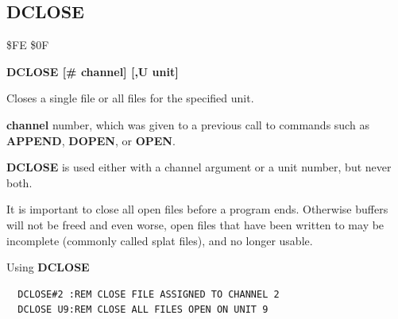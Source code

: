 \subsection{DCLOSE}
\begin{description}[leftmargin=2cm,style=nextline]
\item [Token:] \$FE \$0F
\item [Format:] {\bf DCLOSE [\# channel] [,U unit] }
\item [Usage:]
   Closes a single file or
   all files for the specified unit.

    {\bf channel} number, which was given to a previous
    call to commands such as {\bf APPEND}, {\bf DOPEN}, or {\bf OPEN}.

   \unitdefinition

   {\bf DCLOSE} is used either with a channel argument
   or a unit number, but never both.

\item [Remarks:]
   It is important to close all open files before a program ends.
   Otherwise buffers will not be freed and even worse, open files that have been written to
   may be incomplete (commonly called splat files), and no longer usable.

\item [Examples:] Using {\bf DCLOSE}
\begin{tcolorbox}[colback=black,coltext=white]
\verbatimfont{\codefont}
\begin{verbatim}
  DCLOSE#2 :REM CLOSE FILE ASSIGNED TO CHANNEL 2
  DCLOSE U9:REM CLOSE ALL FILES OPEN ON UNIT 9
\end{verbatim}
\end{tcolorbox}
\end{description}


\newpage
